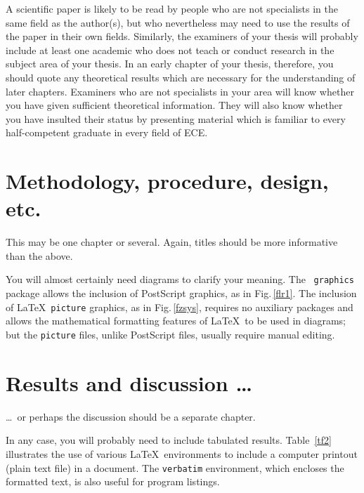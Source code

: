 \documentclass[12pt,openany,a4paper]{book}
\newcommand{\fig}[1]  {Fig.\,\ref{#1}}		%
\newcommand{\tab}[1]  {Table~\ref{#1}}		%
\begin{document}
A scientific paper is likely to be read by people who are not
specialists in the same field as the author(s), but who nevertheless
may need to use the results of the paper in their own fields.
Similarly, the examiners of your thesis will probably include at least
one academic who does not teach or conduct research in the subject
area of your thesis.  In an early chapter of your thesis, therefore,
you should quote any theoretical results which are necessary for the
understanding of later chapters.  Examiners who are not specialists in
your area will know whether you have given sufficient theoretical
information.  They will also know whether you have insulted their
status by presenting material which is familiar to every
half-competent graduate in every field of ECE.

\chapter{Methodology, procedure, design, etc.}

This may be one chapter or several.  Again, titles should be more
informative than the above.

You will almost certainly need diagrams to clarify your meaning.  The
\LaTeXe\ \texttt{graphics} package allows the inclusion of PostScript
graphics, as in \fig{flr1}.  The inclusion of \LaTeX\ \texttt{picture}
graphics, as in \fig{fzsys}, requires no auxiliary packages and allows
the mathematical formatting features of \LaTeX\ to be used in
diagrams; but the \texttt{picture} files, unlike PostScript files,
usually require manual editing.





\chapter{Results and discussion \ldots}

\ldots\ or perhaps the discussion should be a separate chapter.

In any case, you will probably need to include tabulated results.
\tab{tf2} illustrates the use of various \LaTeX\ environments to
include a computer printout (plain text file) in a document.  The
\texttt{verbatim} environment, which encloses the formatted text, is
also useful for program listings.
\end{document}
